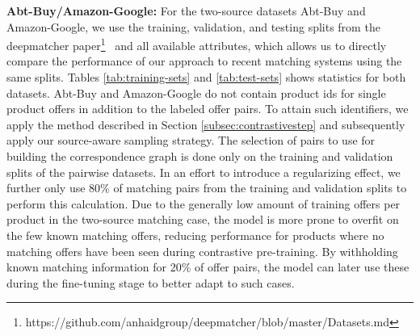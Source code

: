 \documentclass[sigconf]{acmart}
\begin{document}
\textbf{Abt-Buy/Amazon-Google:} For the two-source datasets Abt-Buy and Amazon-Google, we use the training, validation, and testing splits from the deepmatcher paper\footnote{https://github.com/anhaidgroup/deepmatcher/blob/master/Datasets.md}~\cite{mudgalDeepLearningEntity2018} and all available attributes, which allows us to directly compare the performance of our approach to recent matching systems using the same splits. Tables \ref{tab:training-sets} and \ref{tab:test-sets} shows statistics for both datasets. Abt-Buy and Amazon-Google do not contain product ids for single product offers in addition to the labeled offer pairs. To attain such identifiers, we apply the method described in Section \ref{subsec:contrastivestep} and subsequently apply our source-aware sampling strategy. The selection of pairs to use for building the correspondence graph is done only on the training and validation splits of the pairwise datasets. In an effort to introduce a regularizing effect, we further only use 80\% of matching pairs from the training and validation splits to perform this calculation. Due to the generally low amount of training offers per product in the two-source matching case, the model is more prone to overfit on the few known matching offers, reducing performance for products where no matching offers have been seen during contrastive pre-training. By withholding known matching information for 20\% of offer pairs, the model can later use these during the fine-tuning stage to better adapt to such cases.

\begin{table}[htb]
\centering
\caption{Training set statistics}
\label{tab:training-sets}
\end{table}
\end{document}

